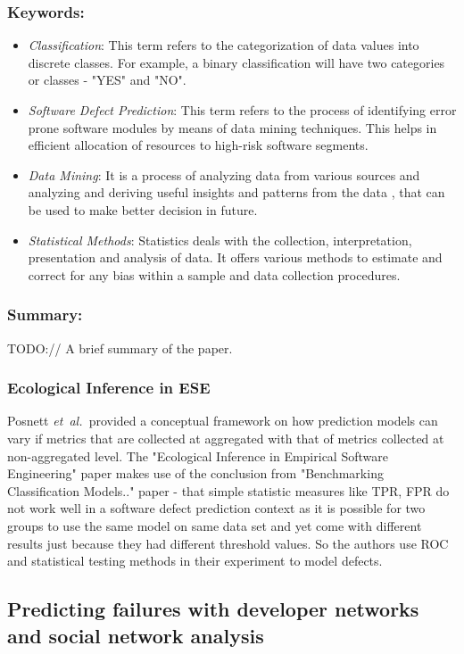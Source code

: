 \documentclass{sig-alternate-05-2015}
\newcommand{\etal}{\mbox{\emph{et al.\ }}}
\begin{document}
\subsubsection{Keywords:}
\begin{itemize}
\item \emph{Classification}: This term refers to the categorization of data values into discrete classes. For example, a binary classification will have two categories or classes - "YES" and "NO".
\item \emph{Software Defect Prediction}: This term refers to the process of identifying error prone software modules by means of data mining techniques. This helps in efficient allocation of resources to high-risk software segments.
\item \emph{Data Mining}: It is a process of analyzing data from various sources and analyzing and deriving useful insights and patterns from the data , that can be used to make better decision in future.
\item \emph{Statistical Methods}: Statistics deals with the collection, interpretation, presentation and analysis of data. It offers various methods to estimate and correct for any bias within a sample and data collection procedures.
\end{itemize} 

\subsubsection{Summary:}
TODO:// A brief summary of the paper.

\subsubsection{Ecological Inference in ESE}
Posnett \etal provided a conceptual framework on how prediction models can vary if metrics that are collected at aggregated with that of metrics collected at non-aggregated level. The "Ecological Inference in Empirical Software Engineering" paper makes use of the conclusion from "Benchmarking Classification Models.." paper - that simple statistic measures like TPR, FPR do not work well in a software defect prediction context as it is possible for two groups to use the same model on same data set and yet come with different results just because they had different threshold values. So the authors use ROC and statistical testing methods in their experiment to model defects.

\subsection{Predicting failures with developer networks and social network analysis \cite{Meneely:2008}}
\end{document}
